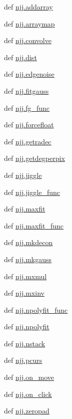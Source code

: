 \begin{DoxyCompactItemize}
\item 
def \hyperlink{namespacenjj_abfa84af11c2bc7c4361f3569adc396df}{njj.\-addarray}
\item 
def \hyperlink{namespacenjj_a8a3e4aa6ebaea61651610ca032c38aa9}{njj.\-arraymap}
\item 
def \hyperlink{namespacenjj_a8c41629fc84338b43350ce96c7602177}{njj.\-convolve}
\item 
def \hyperlink{namespacenjj_aafd856c44409b0f95e079c3b066652c9}{njj.\-dist}
\item 
def \hyperlink{namespacenjj_ab5401bbc10bb9bc098aac9aa6cdf2f86}{njj.\-edgenoise}
\item 
def \hyperlink{namespacenjj_acc7c03fb548bc2d279694b6cee734a6e}{njj.\-fitgauss}
\item 
def \hyperlink{namespacenjj_ae50cf701dffecaa6818e160dc5891c3b}{njj.\-fg\-\_\-func}
\item 
def \hyperlink{namespacenjj_a1e1dffc46466456144b5cfdd5358c565}{njj.\-forcefloat}
\item 
def \hyperlink{namespacenjj_a63339bfa16b2772d0032f666c33aa35b}{njj.\-getradec}
\item 
def \hyperlink{namespacenjj_a8c77b2b24eac4442788fd7df3c9a21da}{njj.\-getdegperpix}
\item 
def \hyperlink{namespacenjj_ac8da89b9c02f65424ca141f8b1596c47}{njj.\-jiggle}
\item 
def \hyperlink{namespacenjj_a8ad51dc917b000f0423e6aa878565e35}{njj.\-jiggle\-\_\-func}
\item 
def \hyperlink{namespacenjj_a1874c1850f26661697e7645269aed7e3}{njj.\-maxfit}
\item 
def \hyperlink{namespacenjj_a9fa58924b945d74e42ead1cfc0d9c189}{njj.\-maxfit\-\_\-func}
\item 
def \hyperlink{namespacenjj_a6437784cc694df41375900c3dc03e227}{njj.\-mkdecon}
\item 
def \hyperlink{namespacenjj_a746009c2f8ce49b0e6721bd670b49707}{njj.\-mkgauss}
\item 
def \hyperlink{namespacenjj_abd150aa97141fb4d02c7480d06fad2a4}{njj.\-mxmul}
\item 
def \hyperlink{namespacenjj_a440b0605a51a87d45cb13ce2c2aff58a}{njj.\-mxinv}
\item 
def \hyperlink{namespacenjj_abf2b142c9e5de71785ac989391350562}{njj.\-npolyfit\-\_\-func}
\item 
def \hyperlink{namespacenjj_ad9f618014dacc7008c18cbfe8f782f00}{njj.\-npolyfit}
\item 
def \hyperlink{namespacenjj_ae1fa8a11fbf900046a9d52d240b2ad69}{njj.\-nstack}
\item 
def \hyperlink{namespacenjj_a11ab94319686d2c712f4dab2d0e1a15c}{njj.\-pcurs}
\item 
def \hyperlink{namespacenjj_a813f9cc86777e4690ddea859e10f21d5}{njj.\-on\-\_\-move}
\item 
def \hyperlink{namespacenjj_a9ab97deb1c883dd051d109213fa8fa29}{njj.\-on\-\_\-click}
\item 
def \hyperlink{namespacenjj_a41a0667632768df671b498eee03fc2e6}{njj.\-zeropad}
\end{DoxyCompactItemize}
